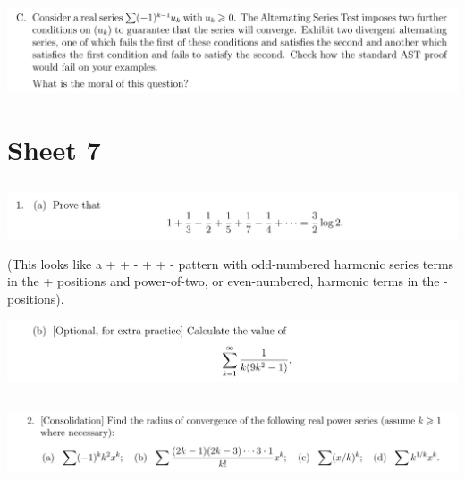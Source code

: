 \documentclass[12pt]{article}
\begin{document}
\newpage
\subsection{}
\begin{mdframed}
\includegraphics[width=400pt]{img/analysis--oxford-M2-I-6-extra-C.png}
\end{mdframed}




\newpage
\section{Sheet 7}

\subsection{}
\begin{mdframed}
\includegraphics[width=400pt]{img/analysis--oxford-M2-I-7-1-a.png}
\end{mdframed}

(This looks like a + + - + + - pattern with odd-numbered harmonic series terms in the + positions
and power-of-two, or even-numbered, harmonic terms in the - positions).


\begin{mdframed}
\includegraphics[width=400pt]{img/analysis--oxford-M2-I-7-1-b.png}
\end{mdframed}

\newpage
\subsection{}
\begin{mdframed}
\includegraphics[width=400pt]{img/analysis--oxford-M2-I-7-2.png}
\end{mdframed}
\end{document}
